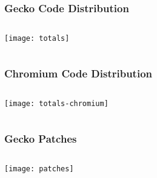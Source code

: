 \documentclass[
	notes=none,
	aspectratio=169
]{beamer}
\begin{document}

\begin{frame}
\frametitle{Gecko Code Distribution}

\begin{columns}[T]
\begin{column}[T]{0.7\textwidth}

\vspace{0.5cm}
\texttt{[image: totals]}

\end{column}
\end{columns}

\end{frame}
\note{
\begin{enumerate}
\item -
\end{enumerate}
}


\begin{frame}
\frametitle{Chromium Code Distribution}

\begin{columns}[T]
\begin{column}[T]{0.7\textwidth}

\vspace{0.5cm}
\texttt{[image: totals-chromium]}

\end{column}
\end{columns}

\end{frame}
\note{
\begin{enumerate}
\item -
\end{enumerate}
}


\begin{frame}
\frametitle{Gecko Patches}

\begin{columns}[T]
\begin{column}[T]{0.7\textwidth}

\vspace{0.5cm}
\texttt{[image: patches]}

\end{column}
\end{columns}

\end{frame}
\note{
\begin{enumerate}
\item -
\end{enumerate}
}
\end{document}
